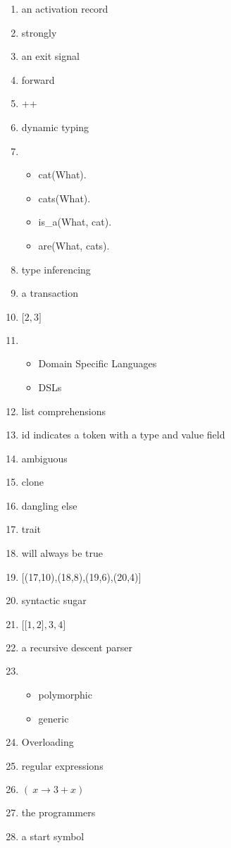 \documentclass{exam}
\begin{document}
\begin{enumerate}
\begin{itemize}
\end{itemize}
\item an activation record
\item strongly
\item an exit signal
\item forward
\item ++
\item dynamic typing
\item \begin{itemize}
\item cat(What).
\item cats(What).
\item is\_a(What, cat).
\item are(What, cats).
\end{itemize}
\item type inferencing
\item a transaction
\item $\lbrack 2, 3\rbrack$
\item \begin{itemize}
\item Domain Specific Languages
\item DSLs
\end{itemize}
\item list comprehensions
\item id indicates a token with a type and value field
\item ambiguous
\item clone
\item dangling else
\item trait
\item will always be true
\item $\lbrack$(17,10),(18,8),(19,6),(20,4)$\rbrack$
\item syntactic sugar
\item $\lbrack \lbrack 1, 2\rbrack, 3, 4\rbrack$
\item a recursive descent parser
\item \begin{itemize}
\item polymorphic
\item generic
\end{itemize}
\item Overloading
\item regular expressions
\item $(\ x \rightarrow 3 + x)$
\item the programmers
\item a start symbol

\end{enumerate}
\end{document}
